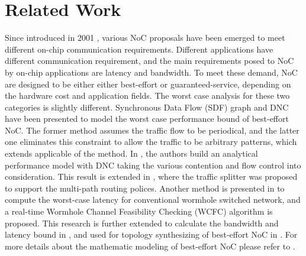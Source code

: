 \documentclass[10pt,journal]{IEEEtran}
\begin{document}
\section{Related Work}\label{related}
Since introduced in 2001 \cite{DaTo01}, various NoC proposals have been emerged to meet different on-chip communication requirements. Different applications have different communication requirement, and the main requirements posed to NoC by on-chip applications are latency and bandwidth. To meet these demand, NoC are designed to be either either best-effort or guaranteed-service, depending on the hardware cost and application fields. The worst case analysis for these two categories is slightly different. Synchronous Data Flow (SDF) graph \cite{poplavko2003task} and DNC \cite{qian2009analysis} have been presented to model the worst case performance bound of best-effort NoC. The former method assumes the traffic flow to be periodical, and the latter one eliminates this constraint to allow the traffic to be arbitrary patterns, which extends applicable of the method. In \cite{qian2009analysis}, the authors build an analytical performance model with DNC taking the various contention and flow control into consideration. This result is extended in \cite{Du:2012:WPA:2380445.2380469}, where the traffic splitter was proposed to support the multi-path routing polices. Another method is presented in \cite{Lee:2003:RWC:846077.846083} to compute the worst-case latency for conventional wormhole switched network, and a real-time Wormhole Channel Feasibility Checking (WCFC) algorithm is proposed. This research is further extended to calculate the bandwidth and latency bound in \cite{6109240}, and used for topology synthesizing of best-effort NoC in \cite{EPFL-ARTICLE-186879}. For more details about the mathematic modeling of best-effort NoC please refer to \cite{Kiasari:2013:MFP:2480741.2480755}.
\end{document}
